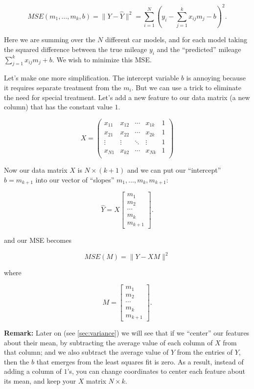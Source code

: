 \documentclass[]{article}
\begin{document}
\[
MSE(m_1,\ldots, m_k,b) = \|Y-\hat{Y}\|^2 = \sum_{i=1}^{N} (y_i - \sum_{j=1}^{k}  x_{ij}m_j -b )^2.
\]

Here we are summing over the \(N\) different car models, and for each
model taking the squared difference between the true mileage \(y_i\) and
the ``predicted'' mileage \(\sum_{j=1}^{k} x_{ij}m_j +b\). We wish to
minimize this MSE.

Let's make one more simplification. The intercept variable \(b\) is
annoying because it requires separate treatment from the \(m_i\). But we
can use a trick to eliminate the need for special treatment. Let's add a
new feature to our data matrix (a new column) that has the constant
value \(1\).

\[
X = \left(\begin{matrix}
x_{11} & x_{12} & \cdots & x_{1k} & 1\\
x_{21} & x_{22} & \cdots & x_{2k} & 1\\
\vdots & \vdots & \ddots & \vdots & 1\\
x_{N1} & x_{k2} & \cdots & x_{Nk} & 1\\
\end{matrix}\right)
\]

Now our data matrix \(X\) is \(N\times(k+1)\) and we can put our
``intercept'' \(b=m_{k+1}\) into our vector of ``slopes''
\(m_1, \ldots, m_k,m_{k+1}\):

\[
\hat{Y} = X\left[\begin{matrix} m_1 \\ m_2 \\ \cdots \\ m_k \\ m_{k+1}\end{matrix}\right].
\]

and our MSE becomes

\[
MSE(M) = \|Y - XM\|^2
\]

where

\[
M=\left[\begin{matrix} m_1 \\ m_2 \\ \cdots \\ m_k \\ m_{k+1}\end{matrix}\right].
\]

\textbf{Remark:} Later on (see \cref{sec:variance}) we will see that if
we ``center'' our features about their mean, by subtracting the average
value of each column of \(X\) from that column; and we also subtract the
average value of \(Y\) from the entries of \(Y\), then the \(b\) that
emerges from the least squares fit is zero. As a result, instead of
adding a column of \(1\)'s, you can change coordinates to center each
feature about its mean, and keep your \(X\) matrix \(N\times k\).
\end{document}

